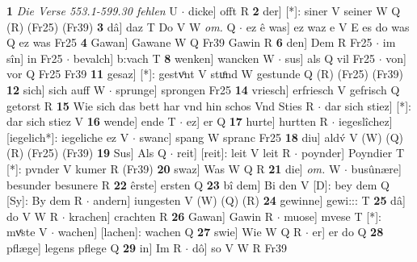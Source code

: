 \documentclass[8pt,a4paper,notitlepage]{article}
\begin{document}
\begin{table}[ht]
\begin{minipage}[t]{0.5\linewidth}
\textbf{1} \textit{Die Verse 553.1-599.30 fehlen} U   $\cdot$ dicke] offt R \textbf{2} der] [*]: siner V seiner W Q (R) (Fr25) (Fr39) \textbf{3} dâ] daz T Do V W \textit{om.} Q  $\cdot$ ez ê was] ez waz e V E es do was Q ez was Fr25 \textbf{4} Gawan] Gawane W Q Fr39 Gawin R \textbf{6} den] Dem R Fr25  $\cdot$ im sîn] in Fr25  $\cdot$ bevalch] b:vach T \textbf{8} wenken] wancken W  $\cdot$ sus] als Q vil Fr25  $\cdot$ von] vor Q Fr25 Fr39 \textbf{11} gesaz] [*]: gestvͦnt V stuͦnd W gestunde Q (R) (Fr25) (Fr39) \textbf{12} sich] sich auff W  $\cdot$ sprunge] sprongen Fr25 \textbf{14} vriesch] erfriesch V gefrisch Q getorst R \textbf{15} Wie sich das bett har vnd hin schos Vnd Sties R  $\cdot$ dar sich stiez] [*]: dar sich stiez V \textbf{16} wende] ende T  $\cdot$ ez] er Q \textbf{17} hurte] hurtten R  $\cdot$ iegeslîchez] [iegelich*]: iegeliche ez V  $\cdot$ swanc] spang W spranc Fr25 \textbf{18} diu] aldv́ V (W) (Q) (R) (Fr25) (Fr39) \textbf{19} Sus] Als Q  $\cdot$ reit] [reit]: leit V leit R  $\cdot$ poynder] Poyndier T [*]: pvnder V kumer R (Fr39) \textbf{20} swaz] Was W Q R \textbf{21} die] \textit{om.} W  $\cdot$ busûnære] besunder besunere R \textbf{22} êrste] ersten Q \textbf{23} bî dem] Bi den V [D]: bey dem Q [Sy]: By dem R  $\cdot$ andern] iungesten V (W) (Q) (R) \textbf{24} gewinne] gewi::: T \textbf{25} dâ] do V W R  $\cdot$ krachen] crachten R \textbf{26} Gawan] Gawin R  $\cdot$ muose] mvese T [*]: mvͤste V  $\cdot$ wachen] [lachen]: wachen Q \textbf{27} swie] Wie W Q R  $\cdot$ er] er do Q \textbf{28} pflæge] legens pflege Q \textbf{29} in] Im R  $\cdot$ dô] so V W R Fr39 \newline
\end{minipage}
\end{table}
\end{document}
